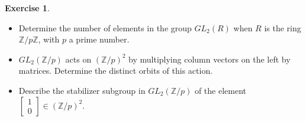 \documentclass[12pt, psamsfonts]{amsart}
\theoremstyle{definition}
\newtheorem*{exer}{Exercise}
\theoremstyle{remark}
\numberwithin{equation}{section}
\begin{document}
\begin{exer}
  $ $
  \begin{itemize}
    \item
      Determine the number of elements in the group $GL_2(R)$ when $R$ is the ring $\mathbb{Z} / p\mathbb{Z}$, with $p$ a prime number.
    \item
      $GL_2(\mathbb{Z} / p)$ acts on $(\mathbb{Z} / p)^2$ by multiplying column vectors on the left by matrices.
      Determine the distinct orbits of this action.
    \item
      Describe the stabilizer subgroup in $GL_2(\mathbb{Z} / p)$ of the element $\begin{bmatrix} 1 \\ 0 \end{bmatrix} \in (\mathbb{Z} / p)^2$.
  \end{itemize}
\end{exer}
\end{document}
